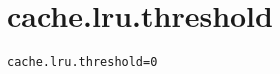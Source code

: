 \section{cache.lru.threshold}
\label{configuration:CacheLruThreshold}
\ClearAPI
\TODO
{}
\begin{lstlisting}[style=Props,caption={Usage example for \textit{cache.lru.threshold}}]
cache.lru.threshold=0
\end{lstlisting}